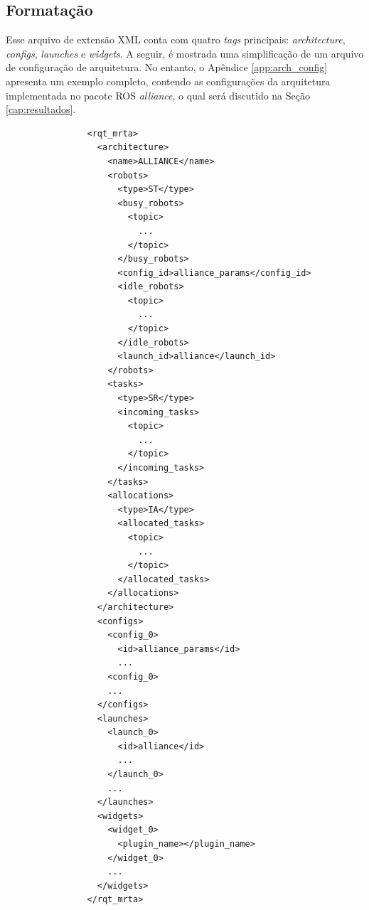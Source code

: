         \subsection{Formatação} \label{subsec:arch_config_fmt}
            Esse arquivo de extensão XML conta com quatro \textit{tags} principais: \textit{architecture}, \textit{configs}, \textit{launches} e \textit{widgets}. A seguir, é mostrada uma simplificação de um arquivo de configuração de arquitetura. No entanto, o Apêndice \ref{app:arch_config} apresenta um exemplo completo, contendo as configurações da arquitetura implementada no pacote ROS \textit{alliance}, o qual será discutido na Seção \ref{cap:resultados}.
            
            \begin{lstlisting}
                <rqt_mrta>
                  <architecture>
                    <name>ALLIANCE</name>
                    <robots>
                      <type>ST</type>
                      <busy_robots>
                        <topic>
                          ...
                        </topic>
                      </busy_robots>
                      <config_id>alliance_params</config_id>
                      <idle_robots>
                        <topic>
                          ...
                        </topic>
                      </idle_robots>
                      <launch_id>alliance</launch_id>
                    </robots>
                    <tasks>
                      <type>SR</type>
                      <incoming_tasks>
                        <topic>
                          ...
                        </topic>
                      </incoming_tasks>
                    </tasks>
                    <allocations>
                      <type>IA</type>
                      <allocated_tasks>
                        <topic>
                          ...
                        </topic>
                      </allocated_tasks>
                    </allocations>
                  </architecture>
                  <configs>
                    <config_0>
                      <id>alliance_params</id>
                      ...
                    <config_0>
                    ...
                  </configs>
                  <launches>
                    <launch_0>
                      <id>alliance</id>
                      ...
                    </launch_0>
                    ...
                  </launches>
                  <widgets>
                    <widget_0>
                      <plugin_name></plugin_name>
                    </widget_0>
                    ...
                  </widgets>
                </rqt_mrta>
            \end{lstlisting}
            
